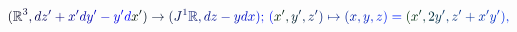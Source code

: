 \documentclass[12pt]{article}
\begin{document}
\makeatletter
\renewcommand*{\@textcolor}[3]{%
  \protect\leavevmode
  \begingroup
    \color#1{#2}#3%
  \endgroup
}
\makeatother
\begin{displaymath}
\mathcolor[RGB]{0,0,15}{(} \mathbb { \mathcolor[RGB]{0,0,30}{R} } ^ { \mathcolor[RGB]{0,0,45}{3} } \mathcolor[RGB]{0,0,60}{,} \mathcolor[RGB]{0,0,75}{d} \mathcolor[RGB]{0,0,90}{z} ^ { \mathcolor[RGB]{0,0,105}{\prime} } \mathcolor[RGB]{0,0,120}{+} \mathcolor[RGB]{0,0,135}{x} ^ { \mathcolor[RGB]{0,0,150}{\prime} } \mathcolor[RGB]{0,0,165}{d} \mathcolor[RGB]{0,0,180}{y} ^ { \mathcolor[RGB]{0,0,195}{\prime} } \mathcolor[RGB]{0,0,210}{-} \mathcolor[RGB]{0,0,225}{y} ^ { \mathcolor[RGB]{0,0,240}{\prime} } \mathcolor[RGB]{0,0,255}{d} \mathcolor[RGB]{0,15,0}{x} ^ { \mathcolor[RGB]{0,15,15}{\prime} } \mathcolor[RGB]{0,15,30}{)} \mathcolor[RGB]{0,15,45}{\to} \mathcolor[RGB]{0,15,60}{(} \mathcolor[RGB]{0,15,75}{J} ^ { \mathcolor[RGB]{0,15,90}{1} } \mathbb { \mathcolor[RGB]{0,15,105}{R} } \mathcolor[RGB]{0,15,120}{,} \mathcolor[RGB]{0,15,135}{d} \mathcolor[RGB]{0,15,150}{z} \mathcolor[RGB]{0,15,165}{-} \mathcolor[RGB]{0,15,180}{y} \mathcolor[RGB]{0,15,195}{d} \mathcolor[RGB]{0,15,210}{x} \mathcolor[RGB]{0,15,225}{)} \mathcolor[RGB]{0,15,240}{;} \, \mathcolor[RGB]{0,15,255}{(} \mathcolor[RGB]{0,30,0}{x} ^ { \mathcolor[RGB]{0,30,15}{\prime} } \mathcolor[RGB]{0,30,30}{,} \mathcolor[RGB]{0,30,45}{y} ^ { \mathcolor[RGB]{0,30,60}{\prime} } \mathcolor[RGB]{0,30,75}{,} \mathcolor[RGB]{0,30,90}{z} ^ { \mathcolor[RGB]{0,30,105}{\prime} } \mathcolor[RGB]{0,30,120}{)} \mathcolor[RGB]{0,30,135}{\mapsto} \mathcolor[RGB]{0,30,150}{(} \mathcolor[RGB]{0,30,165}{x} \mathcolor[RGB]{0,30,180}{,} \mathcolor[RGB]{0,30,195}{y} \mathcolor[RGB]{0,30,210}{,} \mathcolor[RGB]{0,30,225}{z} \mathcolor[RGB]{0,30,240}{)} \mathcolor[RGB]{0,30,255}{=} \mathcolor[RGB]{0,45,0}{(} \mathcolor[RGB]{0,45,15}{x} ^ { \mathcolor[RGB]{0,45,30}{\prime} } \mathcolor[RGB]{0,45,45}{,} \mathcolor[RGB]{0,45,60}{2} \mathcolor[RGB]{0,45,75}{y} ^ { \mathcolor[RGB]{0,45,90}{\prime} } \mathcolor[RGB]{0,45,105}{,} \mathcolor[RGB]{0,45,120}{z} ^ { \mathcolor[RGB]{0,45,135}{\prime} } \mathcolor[RGB]{0,45,150}{+} \mathcolor[RGB]{0,45,165}{x} ^ { \mathcolor[RGB]{0,45,180}{\prime} } \mathcolor[RGB]{0,45,195}{y} ^ { \mathcolor[RGB]{0,45,210}{\prime} } \mathcolor[RGB]{0,45,225}{)} \mathcolor[RGB]{0,45,240}{,}
\end{displaymath}
\end{document}
